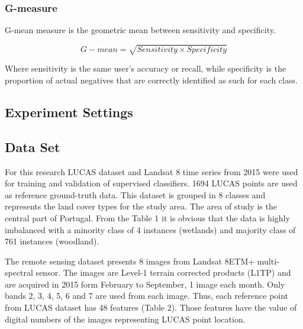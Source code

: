 \documentclass[parskip=full]{scrartcl}
\begin{document}
\subsubsection{G-measure}

G-mean measure is the geometric mean between sensitivity and specificity.

\[G{-}mean = \sqrt{Sensitivity \times Specificity}\]

Where sensitivity is the same user's accuracy or recall, while specificity is
the proportion of actual negatives that are correctly identified as such for
each class.

\subsection{Experiment Settings}

\subsection{Data Set}

For this research LUCAS dataset and Landsat 8 time series from 2015 were used
for training and validation of supervised classifiers. 1694 LUCAS points are
used as reference ground-truth data. This dataset is grouped in 8 classes and
represents the land cover types for the study area. The area of study is the
central part of Portugal. From the Table 1 it is obvious that the data is
highly imbalanced with a minority class of 4 instances (wetlands) and majority
class of 761 instances (woodland).

The remote sensing dataset presents 8 images from Landsat 8ETM+ multi-spectral
sensor. The images are Level-1 terrain corrected products (L1TP) and are
acquired in 2015 form February to September, 1 image each month. Only bands 2,
3, 4, 5, 6 and 7 are used from each image. Thus, each reference point from
LUCAS dataset has 48 features (Table 2). Those features have the value of
digital numbers of the images representing LUCAS point location.
\end{document}
